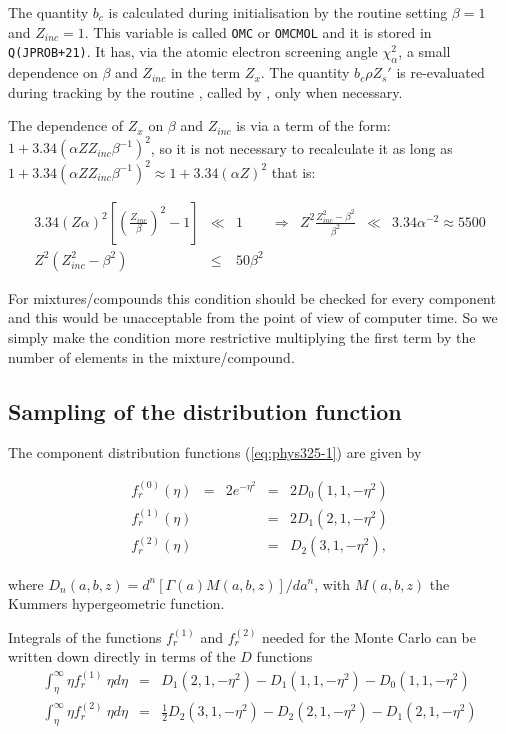 The quantity $b_c$ is calculated during initialisation by
the routine  setting $\beta=1$ and $Z_{inc}=1$. 
This variable is called
{\tt OMC} or {\tt OMCMOL} and it is stored in {\tt Q(JPROB+21)}.
It has, via the atomic electron screening angle $\chi_{\alpha}^2$,
a small dependence
on $\beta$  and $Z_{inc}$ in the term $Z_x$. The quantity $b_c \rho Z_s'$
is re-evaluated during tracking by the routine , called by
, only when necessary.

The dependence of $Z_x$ on $\beta$ and $Z_{inc}$ is via a term of the form:
$1+3.34\left(\alpha Z Z_{inc}\beta^{-1} \right )^2$, so it is not 
necessary to recalculate it as long as
$1 + 3.34\left(\alpha Z Z_{inc}\beta^{-1} \right )^2 \approx
1 + 3.34\left(\alpha Z \right )^2$ that is:

\[
\begin{array}{RcLcLcL}
3.34 (Z \alpha)^2  \left [ \left( \frac{Z_{inc}}{\beta} \right )^2
-1 \right] & \ll & 1 & \Rightarrow &
Z^2 \frac{Z_{inc}^2 - \beta^2}{\beta^2} & \ll & 3.34 \alpha^{-2} 
\approx 5500 \\ [.2cm]
 Z^2 ( Z_{inc}^2 - \beta^2 ) & \leq & 50 \beta^2
\end{array}
\]

For mixtures/compounds this condition should be checked for every component
and this would be unacceptable from the point of view of computer time. So
we simply make the condition more restrictive multiplying the first term
by the number of elements in the mixture/compound.

\subsection{Sampling of the distribution function}

The component distribution functions (\ref{eq:phys325-1}) are given by
 
\[
\begin{array}{lcccr}
f_{r}^{(0)}(\eta)   & = & 2e^{-\eta^2}  & = &  2D_0(1,1,-\eta^2)         \\
f_{r}^{(1)}(\eta)   &   &               & = &  2D_1(2,1,-\eta^2)         \\
f_{r}^{(2)}(\eta)   &   &               & = &   D_2(3,1,-\eta^2),
\end{array}
\]
 
where $ D_n(a,b,z) = d^n[\Gamma(a)M(a,b,z)]/d a^n $, with
$M(a,b,z)$ the Kummers hypergeometric function.
 
Integrals of the functions $f_{r}^{(1)}$ and $f_{r}^{(2)}$ needed for the
Monte Carlo can be written down directly in terms of the $D$ functions
\begin{eqnarray*}
\int_{\eta}^{\infty}\eta f_{r}^{(1)} \: \eta  d\eta & = &
     D_1 ( 2,1, - \eta^2)-D_1( 1,1, - \eta^2 ) - D_0 ( 1,1,-\eta^2)\\
\int_{\eta}^{\infty}\eta f_{r}^{(2)} \: \eta d\eta    & = &
\frac{1}{2} D_2 (3,1,-\eta^2) - D_2 (2,1,-\eta^2) - D_1(2,1,-\eta^2)
\end{eqnarray*}
 
